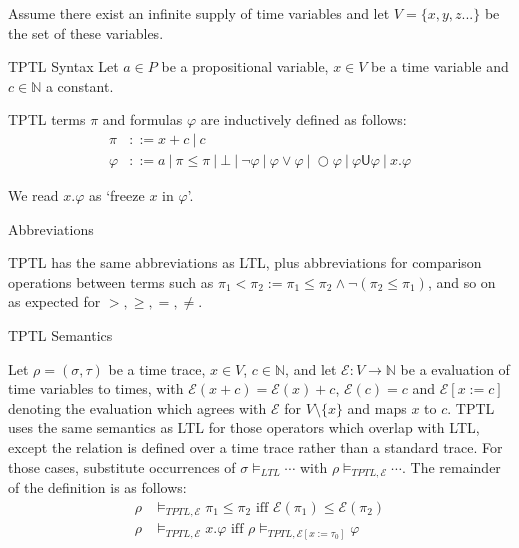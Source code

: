 \documentclass[a4paper]{article}
\newcommand{\U}{\mathsf{U}}
\newcommand{\tiff}{\text{ iff }}
\newcommand{\eval}{\mathcal{E}}
\begin{document}
Assume there exist an infinite supply of time variables  and let $V=\{x,y,z...\}$ be the set of these variables.

\begin{defn}{TPTL Syntax}\label{tptlsyn}
  Let $a\in P$ be a propositional variable, $x\in V$ be a time variable and $c\in\mathbb{N}$ a constant.

  TPTL terms $\pi$ and formulas $\varphi$ are inductively defined as follows:
  \begin{align*}
    \pi &::= x + c ~|~ c\\
    \varphi &::= a ~|~ \pi \leq \pi ~|~ \bot ~|~ \neg \varphi ~|~\varphi \lor \varphi ~|~ \bigcirc \varphi ~|~ \varphi \U \varphi ~|~ x. \varphi
  \end{align*}
\end{defn}

We read $x. \varphi$ as `freeze $x$ in $\varphi$'.

\begin{notn}{Abbreviations}\label{tptlabbrev}

  TPTL has the same abbreviations as LTL, plus abbreviations for comparison operations between terms such as $\pi_1 < \pi_2 := \pi_1 \leq \pi_2 \land \neg(\pi_2 \leq \pi_1)$, and so on as expected for $>,\geq,=,\neq$.
\end{notn}

\begin{defn}{TPTL Semantics}\label{tptlsem}

  Let $\rho = (\sigma,\tau)$ be a time trace, $x\in V$, $c\in\mathbb{N}$, and let $\eval:V\to\mathbb{N}$ be a evaluation of time variables to times, with $\eval(x + c) = \eval(x) + c$, $\eval(c) = c$ and $\eval[x:=c]$ denoting the evaluation which agrees with $\eval$ for $V\setminus\{x\}$ and maps $x$ to $c$.
  TPTL uses the same semantics as LTL for those operators which overlap with LTL, except the relation is defined over a time trace rather than a standard trace. For those cases, substitute occurrences of $\sigma\vDash_{LTL}\cdots$ with $\rho\vDash_{TPTL,\eval}\cdots$. The remainder of the definition is as follows:
  \begin{align*}
    \rho&\vDash_{TPTL,\eval}\pi_1\leq\pi_2 \tiff \eval(\pi_1)\leq\eval(\pi_2)\\
    \rho&\vDash_{TPTL,\eval} x.\varphi \tiff \rho\vDash_{TPTL,\eval[x:=\tau_0]}\varphi
  \end{align*}
\end{defn}

\end{document}

